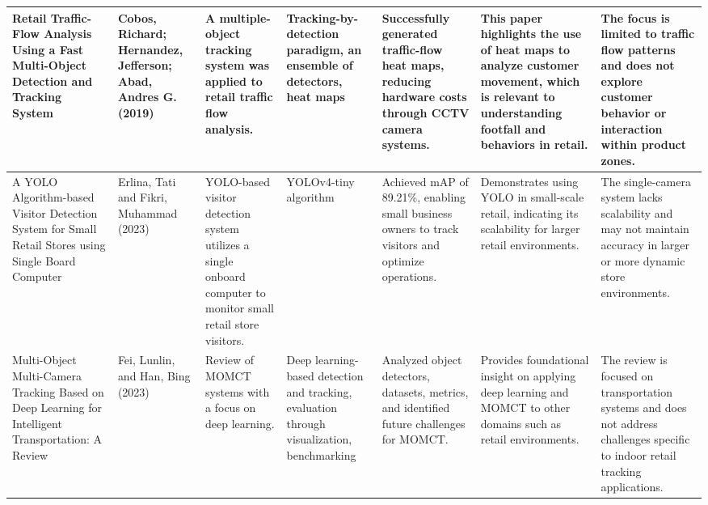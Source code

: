 {\begin{landscape}
\begin{longtable}{|p{2.5cm}|p{2.5cm}|p{2.7cm}|p{2.7cm}|p{2.5cm}|p{2.5cm}|p{2.5cm}|}
		Retail Traffic-Flow Analysis Using a Fast Multi-Object Detection and Tracking System
		& Cobos, Richard; Hernandez, Jefferson; Abad, Andres G. (2019)
		& A multiple-object tracking system was applied to retail traffic flow analysis.
		& Tracking-by-detection paradigm, an ensemble of detectors, heat maps
		& Successfully generated traffic-flow heat maps, reducing hardware costs through CCTV camera systems.
		& This paper highlights the use of heat maps to analyze customer movement, which is relevant to understanding footfall and behaviors in retail.
		& The focus is limited to traffic flow patterns and does not explore customer behavior or interaction within product zones. \\
		\hline
		
		A YOLO Algorithm-based Visitor Detection System for Small Retail Stores using Single Board Computer
		& Erlina, Tati and Fikri, Muhammad (2023)
		& YOLO-based visitor detection system utilizes a single onboard computer to monitor small retail store visitors.
		& YOLOv4-tiny algorithm
		& Achieved mAP of 89.21\%, enabling small business owners to track visitors and optimize operations.
		& Demonstrates using YOLO in small-scale retail, indicating its scalability for larger retail environments.
		& The single-camera system lacks scalability and may not maintain accuracy in larger or more dynamic store environments. \\
		\hline
		
		Multi-Object Multi-Camera Tracking Based on Deep Learning for Intelligent Transportation: A Review
		& Fei, Lunlin, and Han, Bing (2023)
		& Review of MOMCT systems with a focus on deep learning.
		& Deep learning-based detection and tracking, evaluation through visualization, benchmarking
		& Analyzed object detectors, datasets, metrics, and identified future challenges for MOMCT.
		& Provides foundational insight on applying deep learning and MOMCT to other domains such as retail environments.
		& The review is focused on transportation systems and does not address challenges specific to indoor retail tracking applications. \\
		\hline
		

\end{longtable}
\end{landscape}}
